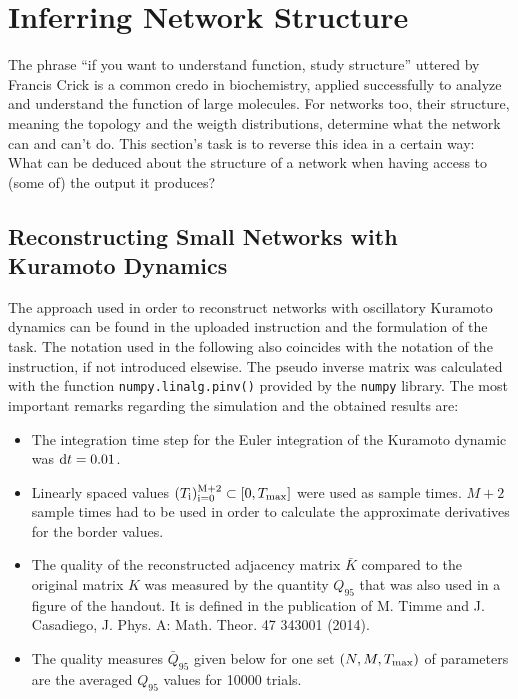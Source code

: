 \documentclass{scrartcl}
\begin{document}
\clearpage
\section{Inferring Network Structure}
The phrase \enquote{if you want to understand function, study structure}
uttered by Francis Crick is a common credo in biochemistry, applied
successfully to analyze and understand the function of large molecules. For
networks too, their structure, meaning the topology and the weigth
distributions, determine what the network can and can't do. This section's
task is to reverse this idea in a certain way: What can be deduced about
the structure of a network when having access to (some of) the output it
produces?

\subsection{Reconstructing Small Networks with Kuramoto Dynamics}
The approach used in order to reconstruct networks with oscillatory
Kuramoto dynamics can be found in the uploaded instruction and the
formulation of the task. The notation used in the following also coincides
with the notation of the instruction, if not introduced elsewise. The
pseudo inverse matrix was calculated with the function
\texttt{numpy.linalg.pinv()} provided by the \texttt{numpy} library.
The most important remarks regarding the simulation and the obtained
results are:
\begin{itemize}
    \item The integration time step for the Euler integration of the
        Kuramoto dynamic was $\mathrm{d} t = 0.01$.
    \item Linearly spaced values $(T_{\mathrm{i}})_{\mathrm{i=0}}^{\mathrm{M+2}} \subset [0,
        T_{\mathrm{max}}]$ were used as sample times. $M+2$ sample times had to be
        used in order to calculate the approximate derivatives for the border values. 
    \item The quality of the reconstructed adjacency matrix $\bar{K}$
        compared to the original matrix $K$ was measured by the quantity $Q_{95}$
        that was also used in a figure of the handout. It is defined
        in the publication of M. Timme and J. Casadiego, J. Phys. A: Math.
        Theor. 47 343001 (2014).
    \item The quality measures $\bar{Q}_{95}$ given below for one set $(N,
        M, T_{\mathrm{max}})$ of parameters are the averaged $Q_{95}$ values for
        10000 trials.
\end{itemize}
\end{document}

